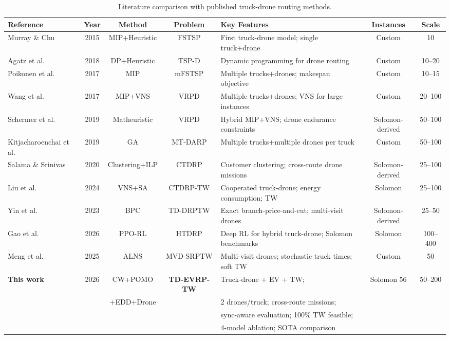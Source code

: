 \begin{table}[t]
\caption{Literature comparison with published truck-drone routing methods.}
\label{tab:lit_drone}
\small
\centering
\begin{tabular}{l c c c p{3.2cm} c c}
\toprule
\textbf{Reference} & \textbf{Year} & \textbf{Method} & \textbf{Problem} & \textbf{Key Features} & \textbf{Instances} & \textbf{Scale} \\
\midrule
Murray \& Chu~\cite{murray2015flying} & 2015 & MIP+Heuristic & FSTSP & First truck-drone model; single truck+drone & Custom & 10 \\
Agatz et al.~\cite{agatz2018optimization} & 2018 & DP+Heuristic & TSP-D & Dynamic programming for drone routing & Custom & 10--20 \\
Poikonen et al.~\cite{poikonen2017drone} & 2017 & MIP & mFSTSP & Multiple trucks+drones; makespan objective & Custom & 10--15 \\
Wang et al.~\cite{wang2017vrpd} & 2017 & MIP+VNS & VRPD & Multiple trucks+drones; VNS for large instances & Custom & 20--100 \\
Schermer et al.~\cite{schermer2019matheuristic} & 2019 & Matheuristic & VRPD & Hybrid MIP+VNS; drone endurance constraints & Solomon-derived & 50--100 \\
Kitjacharoenchai et al.~\cite{kitjacharoenchai2019multiple} & 2019 & GA & MT-DARP & Multiple trucks+multiple drones per truck & Custom & 50--100 \\
Salama \& Srinivas~\cite{salama2020collaborative} & 2020 & Clustering+ILP & CTDRP & Customer clustering; cross-route drone missions & Solomon-derived & 25--100 \\
Liu et al.~\cite{liu2024cooperated} & 2024 & VNS+SA & CTDRP-TW & Cooperated truck-drone; energy consumption; TW & Solomon & 25--100 \\
Yin et al.~\cite{yin2023branch} & 2023 & BPC & TD-DRPTW & Exact branch-price-and-cut; multi-visit drones & Solomon-derived & 25--50 \\
Gao et al.~\cite{gao2026reinforcement} & 2026 & PPO-RL & HTDRP & Deep RL for hybrid truck-drone; Solomon benchmarks & Solomon & 100--400 \\
Meng et al.~\cite{meng2025stochastic} & 2025 & ALNS & MVD-SRPTW & Multi-visit drones; stochastic truck times; soft TW & Custom & 50 \\
\midrule
\textbf{This work} & 2026 & CW+POMO & \textbf{TD-EVRP-TW} & Truck-drone + EV + TW; & Solomon 56 & 50--200 \\
 & & +EDD+Drone & & 2 drones/truck; cross-route missions; & & \\
 & & & & sync-aware evaluation; 100\% TW feasible; & & \\
 & & & & 4-model ablation; SOTA comparison & & \\
\bottomrule
\end{tabular}


\end{table}
